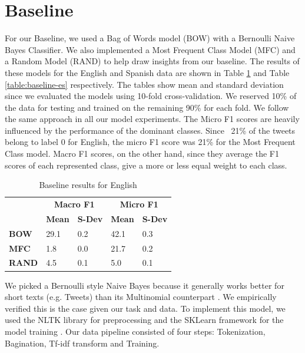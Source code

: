 \documentclass[11pt,a4paper]{article}
\begin{document}
\section{Baseline}

For our Baseline, we used a Bag of Words model (BOW) with a Bernoulli Naive Bayes Classifier. We also implemented a Most Frequent Class Model (MFC) and a Random Model (RAND) to help draw insights from our baseline. The results of these models for the English and Spanish data are shown in Table \ref{table:baseline-en} and Table \ref{table:baseline-es} respectively. The tables show mean and standard deviation since we evaluated the models using 10-fold cross-validation. We reserved 10\% of the data for testing and trained on the remaining 90\% for each fold. We follow the same approach in all our model experiments. The Micro F1 scores are heavily influenced by the performance of the dominant classes. Since ~21\% of the tweets belong to label 0 for English, the micro F1 score was 21\% for the Most Frequent Class model. Macro F1 scores, on the other hand, since they average the F1 scores of each represented class, give a more or less equal weight to each class. 

\begin{table}[]
\centering

\begin{tabular}{@{}l|l|l|l|l|@{}}
\cmidrule(l){2-5}
                                    & \multicolumn{2}{c|}{\textbf{Macro F1}} & \multicolumn{2}{c|}{\textbf{Micro F1}} \\ \cmidrule(l){2-5} 
                                    & \textbf{Mean}     & \textbf{S-Dev}     & \textbf{Mean}     & \textbf{S-Dev}     \\ \midrule
\multicolumn{1}{|l|}{\textbf{BOW}}  & 29.1              & 0.2                & 42.1                & 0.3                 \\ \midrule
\multicolumn{1}{|l|}{\textbf{MFC}}  & 1.8               & 0.0                  & 21.7                & 0.2                 \\ \midrule
\multicolumn{1}{|l|}{\textbf{RAND}} & 4.5               & 0.1                & 5.0                & 0.1                 \\ \bottomrule
\end{tabular}
\caption{Baseline results for English}
\label{table:baseline-en}
\end{table}

We picked a Bernoulli style Naive Bayes because it generally works better for short texts (e.g. Tweets) than its Multinomial counterpart \cite[p.~268]{Manning2008}. We empirically verified this is the case given our task and data. To implement this model, we used the NLTK library for preprocessing and the SKLearn framework for the model training \cite{BirdKleinLoper09} \cite{scikit-learn}. Our data pipeline consisted of four steps: Tokenization, Bagination, Tf-idf transform and Training. 
\end{document}
